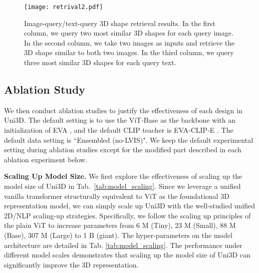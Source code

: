 \documentclass{article} \usepackage{iclr2024_conference,times}
\def\Ours{Uni3D\xspace}
\begin{document}
\begin{figure}[tb]
    \centering
    \texttt{[image: retrival2.pdf]}
    \vspace{-0.5cm}
    \caption{Image-query/text-query 3D shape retrieval results. In the first column, we query two most similar 3D shapes for each query image. In the second column, we  take two images as inputs and retrieve the 3D shape similar to both two images. In the third column, we query three most similar 3D shapes for each query text.}
    \label{fig:retrival_image_text}
    \vspace{-0.5cm}
\end{figure}


\subsection{Ablation Study}

We then conduct ablation studies to justify the effectiveness of each design in \Ours. The default setting is to use the ViT-Base as the backbone with an initialization of EVA \citep{fang2023eva}, and the default CLIP teacher is EVA-CLIP-E \citep{sun2023eva}. The default data setting is ``Ensembled (no-LVIS)". We keep the default experimental setting during ablation studies except for the modified part described in each ablation experiment below. 



\textbf{Scaling Up Model Size.}
We first explore the effectiveness of scaling up the model size of \Ours in Tab.~\ref{tab:model_scaling}. Since we leverage a unified vanilla transformer structurally equivalent to ViT as the foundational 3D representation model, we can simply scale up \Ours with the well-studied unified 2D/NLP scaling-up strategies. Specifically, we follow the scaling up principles of the plain ViT \citep{dosovitskiy2020image} to increase parameters from 6 M (Tiny), 23 M (Small), 88 M (Base), 307 M (Large) to 1 B (giant). The hyper-parameters on the model architecture are detailed in Tab. \ref{tab:model_scaling}. The performance under different model scales demonstrates that scaling up the model size of \Ours can significantly improve the 3D representation. 
\end{document}
